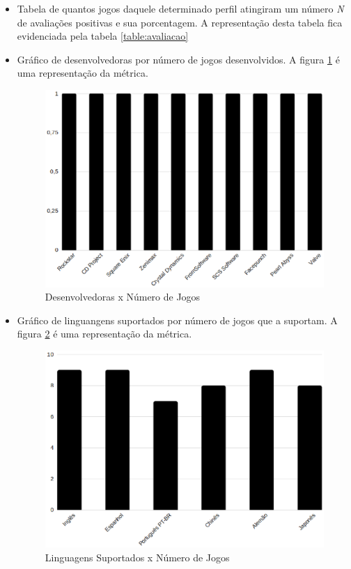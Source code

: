 \begin{itemize}
	\item Tabela de quantos jogos daquele determinado perfil atingiram um número \textit{N} de avaliações positivas e sua porcentagem. A representação desta tabela fica evidenciada pela tabela \ref{table:avaliacao}
	\item Gráfico de desenvolvedoras por número de jogos desenvolvidos. A figura \ref{image:developers} é uma representação da métrica.
	\begin{figure}
	\centering
	\includegraphics[scale=0.4]{figuras/developer.eps}
	\caption{Desenvolvedoras x Número de Jogos}
	\label{image:developers}
	\end{figure}
	\item Gráfico de linguangens suportados por número de jogos que a suportam. A figura \ref{image:languages} é uma representação da métrica.
	\begin{figure}
	\centering
	\includegraphics[scale=0.4]{figuras/language.eps}
	\caption{Linguagens Suportados x Número de Jogos}
	\label{image:languages}
	\end{figure}
\end{itemize}
